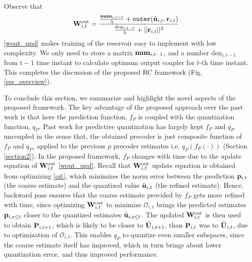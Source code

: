 \documentclass[conference]{IEEEtran}
\newcommand{\highlight}[1]{%
  \colorbox{red!50}{$\displaystyle#1$}}
\begin{document}
{Observe that
\begin{equation}
\bW_{i,t}^{\text{out}}=\frac{\frac{\text{\textbf{num}}_{i,t-1}}{\lambda}+\texttt{outer}(\tilde{\bu}_{i,t},\br_{i,t})}{\frac{\text{den}_{i,t-1}}{\lambda}+||\br_{i,t}||^2}
\label{wout_upd}
\end{equation}
\eqref{wout_upd} makes training of the reservoir easy to implement with low complexity.
We only need to store a matrix $\text{\textbf{num}}_{i,t-1}$, and a number $\text{den}_{i,t-1}$ from $t-1$ time instant to calculate optimum output coupler for $t$-th time instant. This completes the discussion of the proposed RC framework (Fig. \ref{res_overview}).

To conclude this section, we summarize and highlight the novel aspects of the proposed framework. The key advantage of the proposed approach over the past work \cite{Gupt1905:Predictive,6891198,6545375} is that here the prediction function, $f_P$ is coupled with the quantization function, $q_P$.
Past work for predictive quantization has largely kept $f_P$ and $q_P$ uncoupled in the sense that, the obtained precoder is just composite function of $f_P$ and $q_P$, applied to the previous $p$ precoder estimates i.e. $q_P(f_P(\cdot))$ (Section \ref{section2}). In the proposed framework, $f_P$ changes with time due to the update equation of ${\bf W}_{i,t}^{\text{out}}$ \eqref{wout_upd}. Recall that ${\bf W}_{i,t}^{\text{out}}$ update equation is obtained from optimizing \eqref{oit}, which minimizes the norm error between the prediction ${\bf p}_{i,t}$ (the coarse estimate) and the quantized value $\tilde{{\bf u}}_{i,t}$ (the refined estimate). Hence, backward pass ensures that the coarse estimate provided by $f_P$ gets more refined with time, since optimizing ${\bf W}_{i,t}^{\text{out}}$ to minimize $\mathcal{O}_{i,t}$ brings the predicted estimates ${\bf p}_{i,s\leq t}$ closer to the quantized estimates $\tilde{{\bf u}}_{i,s\leq t}$.
The updated ${\bf W}_{i,t}^{\text{out}}$ is then used to obtain ${\bf P}_{i,t+1}$, which is likely to be closer to $\tilde{{\bf U}}_{i,t+1}$, than ${\bf P}_{i,t}$ was to $\tilde{{\bf U}}_{i,t}$, due to optimization of $\mathcal{O}_{i,t}$.
This enables $q_P$ to quantize even smaller subspaces, since the coarse estimate itself has improved, which in turn brings about lower quantization error, and thus improved performance.


}
\end{document}
